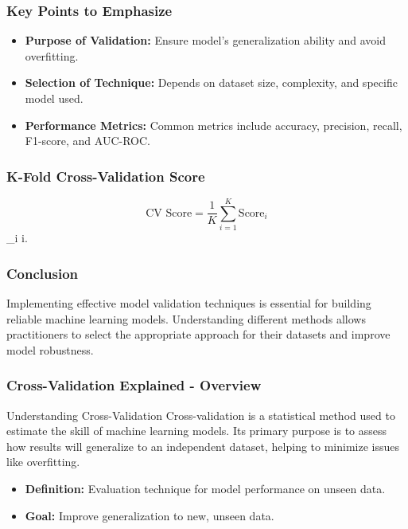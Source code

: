 \documentclass[aspectratio=169]{beamer}
\begin{document}
\begin{frame}[fragile]
    \frametitle{Key Points to Emphasize}
    \begin{itemize}
        \item \textbf{Purpose of Validation:} Ensure model's generalization ability and avoid overfitting.
        \item \textbf{Selection of Technique:} Depends on dataset size, complexity, and specific model used.
        \item \textbf{Performance Metrics:} Common metrics include accuracy, precision, recall, F1-score, and AUC-ROC.
    \end{itemize}
\end{frame}

\begin{frame}[fragile]
    \frametitle{K-Fold Cross-Validation Score}
    \begin{equation}
        \text{CV Score} = \frac{1}{K} \sum_{i=1}^K \text{Score}_i
    \end{equation}
     _i  i.
\end{frame}

\begin{frame}[fragile]
    \frametitle{Conclusion}
    Implementing effective model validation techniques is essential for building reliable machine learning models. Understanding different methods allows practitioners to select the appropriate approach for their datasets and improve model robustness.
\end{frame}

\begin{frame}[fragile]
    \frametitle{Cross-Validation Explained - Overview}
    \begin{block}{Understanding Cross-Validation}
        Cross-validation is a statistical method used to estimate the skill of machine learning models. Its primary purpose is to assess how results will generalize to an independent dataset, helping to minimize issues like overfitting.
    \end{block}
    \begin{itemize}
        \item \textbf{Definition:} Evaluation technique for model performance on unseen data.
        \item \textbf{Goal:} Improve generalization to new, unseen data.
    \end{itemize}
\end{frame}
\end{document}
